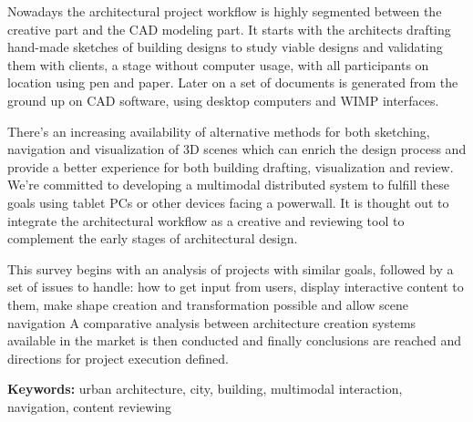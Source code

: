 
Nowadays the architectural project workflow is highly segmented
between the creative part and the CAD modeling part.
It starts with the architects drafting hand-made sketches of building designs
to study viable designs and validating them with clients, a stage without computer usage, 
with all participants on location using pen and paper.
Later on a set of documents is generated from the ground up on CAD software, 
using desktop computers and WIMP interfaces.

There's an increasing availability of alternative methods for both sketching, navigation and visualization
of 3D scenes which can enrich the design process and provide a better experience for both
building drafting, visualization and review.
We're committed to developing a multimodal distributed system to fulfill these goals
using tablet PCs or other devices facing a powerwall.
It is thought out to integrate the architectural workflow as a creative and reviewing tool
to complement the early stages of architectural design.

This survey begins with an analysis of projects with similar goals,
followed by a set of issues to handle:
how to get input from users,
display interactive content to them,
make shape creation and transformation possible and
allow scene navigation
A comparative analysis between architecture creation systems available in the market is then conducted and
finally conclusions are reached and directions for project execution defined.

\textbf{Keywords:} urban architecture, city, building, multimodal interaction, navigation, content reviewing
